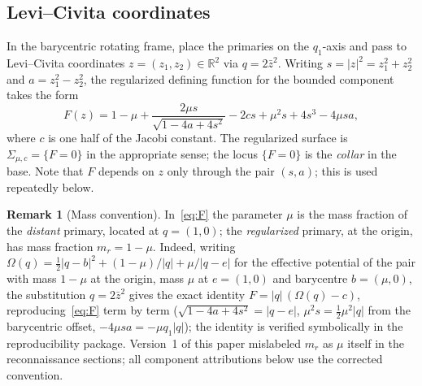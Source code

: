 \documentclass[11pt,reqno]{amsart}
\theoremstyle{plain}
\theoremstyle{definition}
\newtheorem{remark}[theorem]{Remark}
\newcommand{\R}{\mathbb{R}}
\begin{document}
\subsection{Levi--Civita coordinates}
In the barycentric rotating frame, place the primaries on the $q_1$-axis and pass to Levi--Civita coordinates $z=(z_1,z_2)\in\R^2$ via $q=2\bar z^2$. Writing $s=|z|^2=z_1^2+z_2^2$ and $a=z_1^2-z_2^2$, the regularized defining function for the bounded component takes the form
\begin{equation}\label{eq:F}
F(z)=1-\mu+\frac{2\mu s}{\sqrt{1-4a+4s^2}}-2cs+\mu^2 s+4s^3-4\mu s a,
\end{equation}
where $c$ is one half of the Jacobi constant. The regularized surface is $\Sigma_{\mu,c}=\{F=0\}$ in the appropriate sense; the locus $\{F=0\}$ is the \emph{collar} in the base. Note that $F$ depends on $z$ only through the pair $(s,a)$; this is used repeatedly below.

\begin{remark}[Mass convention]\label{rem:mass}
In~\eqref{eq:F} the parameter $\mu$ is the mass fraction of the \emph{distant} primary, located at $q=(1,0)$; the \emph{regularized} primary, at the origin, has mass fraction $m_r=1-\mu$. Indeed, writing $\Omega(q)=\tfrac12|q-b|^2+(1-\mu)/|q|+\mu/|q-e|$ for the effective potential of the pair with mass $1-\mu$ at the origin, mass $\mu$ at $e=(1,0)$ and barycentre $b=(\mu,0)$, the substitution $q=2\bar z^2$ gives the exact identity $F=|q|\,(\Omega(q)-c)$, reproducing~\eqref{eq:F} term by term ($\sqrt{1-4a+4s^2}=|q-e|$, $\mu^2 s=\tfrac12\mu^2|q|$ from the barycentric offset, $-4\mu sa=-\mu q_1|q|$); the identity is verified symbolically in the reproducibility package. Version~1 of this paper mislabeled $m_r$ as $\mu$ itself in the reconnaissance sections; all component attributions below use the corrected convention.
\end{remark}
\end{document}
